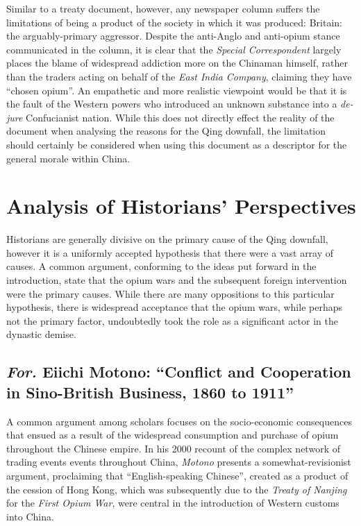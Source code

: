 \documentclass{article}
\begin{document}
        Similar to a treaty document, however, any newspaper column suffers the limitations of being a product of the society in which it was produced: Britain: the arguably-primary aggressor. Despite the anti-Anglo and anti-opium stance communicated in the column, it is clear that the \textit{Special Correspondent} largely places the blame of widespread addiction more on the Chinaman himself, rather than the traders acting on behalf of the \textit{East India Company}, claiming they have ``chosen opium''. An empathetic and more realistic viewpoint would be that it is the fault of the Western powers who introduced an unknown substance into a \textit{de-jure} Confucianist \autocite{Billioud:2007} nation. While this does not directly effect the reality of the document when analysing the reasons for the Qing downfall, the limitation should certainly be considered when using this document as a descriptor for the general morale within China.

\section{Analysis of Historians' Perspectives}

        Historians are generally divisive on the primary cause of the Qing downfall, however it is a uniformly accepted hypothesis that there were a vast array of causes. A common argument, conforming to the ideas put forward in the introduction, state that the opium wars and the subsequent foreign intervention were the primary causes. While there are many oppositions to this particular hypothesis, there is widespread acceptance that the opium wars, while perhaps not the primary factor, undoubtedly took the role as a significant actor in the dynastic demise.

\subsection{\emph{For.} Eiichi Motono: ``Conflict and Cooperation in Sino-British Business, 1860 to 1911''}

        A common argument among scholars focuses on the socio-economic consequences that ensued as a result of the widespread consumption and purchase of opium throughout the Chinese empire. In his 2000 recount of the complex network of trading events events throughout China, \textit{Motono} presents a somewhat-revisionist argument, proclaiming that ``English-speaking Chinese'', created as a product of the cession of Hong Kong, which was subsequently due to the \textit{Treaty of Nanjing} for the \textit{First Opium War}, were central in the introduction of Western customs into China.
\end{document}
